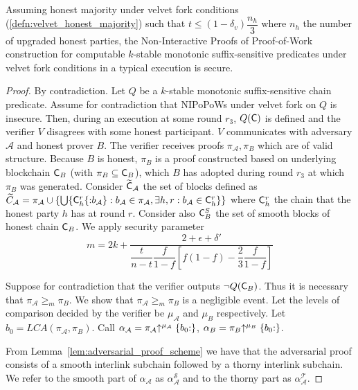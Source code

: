 \begin{theorem}
	Assuming honest majority under velvet fork conditions (\ref{defn:velvet_honest_majority}) such that $t \leq (1 - \delta_v) \dfrac{n_h}{3}$ where $n_h$ the number of upgraded honest parties, the Non-Interactive Proofs of Proof-of-Work construction for computable $k$-stable monotonic suffix-sensitive predicates under velvet fork conditions in a typical execution is secure.
\end{theorem}
\begin{proof}
By contradiction. Let $Q$ be a $k$-stable monotonic suffix-sensitive chain predicate. Assume for contradiction that NIPoPoWs under velvet fork on $Q$ is insecure. Then, during an execution at some round  $r_3$, $Q(\mathsf{C})$ is defined and the verifier $V$ disagrees with some honest participant. $V$ communicates with adversary $\mathcal{A}$ and honest prover $B$. The verifier receives proofs $\pi_\mathcal{A}, \pi_B$ which are of valid structure. Because $B$ is honest, $\pi_B$ is a proof constructed based on underlying blockchain $\mathsf{C}_B$ (with $\pi_B \subseteq \mathsf{C}_B$), which $B$ has adopted during round $r_3$ at which $\pi_B$ was generated. Consider $\widetilde{\mathsf{C}}_\mathcal{A}$ the set of blocks defined as $\widetilde{C}_\mathcal{A} = \pi_\mathcal{A} \cup \{ \bigcup \{\mathsf{C}_h^r\{{:}b_\mathcal{A}\}:  b_\mathcal{A} \in \pi_\mathcal{A}, \exists h,r : b_\mathcal{A} \in \mathsf{C}_{h}^{r}\}  \}$ where $\mathsf{C}_h^r$ the chain that the honest party $h$ has at round $r$. Consider also $\mathsf{C}^S_B$ the set of smooth blocks of honest chain $\mathsf{C}_B$. We apply security parameter
\begin{equation*}
    m = 2k + \dfrac{2+\epsilon + \delta'}{\dfrac{t}{n-t}\dfrac{f}{1-f}[f(1-f) - \dfrac{2}{3}\dfrac{f}{1-f}]}
\end{equation*}

Suppose for contradiction that the verifier outputs $\neg Q(\mathsf{C}_B)$. Thus it is necessary that $\pi_\mathcal{A} {\geq}_m \pi_B$. We show that $\pi_\mathcal{A} {\geq}_m \pi_B$ is a negligible event.
Let the levels of comparison decided by the verifier be $\mu_\mathcal{A}$ and $\mu_B$ respectively. Let $b_0 = LCA(\pi_\mathcal{A}, \pi_B)$. Call $\alpha_\mathcal{A} = \pi_\mathcal{A} \negthickspace\uparrow^{\mu_\mathcal{A}}\{b_0{:}\}$, $\alpha_B = \pi_B \negthickspace\uparrow^{\mu_B}\{b_0{:}\}$.

From Lemma~\ref{lem:adversarial_proof_scheme} we have that the adversarial proof consists of a smooth interlink subchain followed by a thorny interlink subchain. We refer to the smooth part of $\alpha_\mathcal{A}$ as $\alpha^{\mathcal{S}}_\mathcal{A}$ and to the thorny part as $\alpha^{\mathcal{T}}_\mathcal{A}$.


\end{proof}

